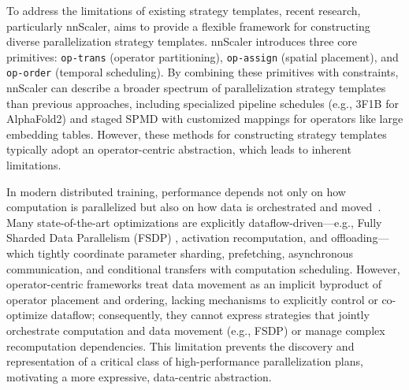 \documentclass[letterpaper,twocolumn,10pt]{article}
\begin{document}

To address the limitations of existing strategy templates, recent research, particularly nnScaler, aims to provide a flexible framework for constructing diverse parallelization strategy templates. nnScaler introduces three core primitives: \texttt{op-trans} (operator partitioning), \texttt{op-assign} (spatial placement), and \texttt{op-order} (temporal scheduling). By combining these primitives with constraints, nnScaler can describe a broader spectrum of parallelization strategy templates than previous approaches, including specialized pipeline schedules (e.g., 3F1B for AlphaFold2) and staged SPMD with customized mappings for operators like large embedding tables. However, these methods for constructing strategy templates typically adopt an operator-centric abstraction, which leads to inherent limitations.

In modern distributed training, performance depends not only on how computation is parallelized but also on how data is orchestrated and moved~\cite{huang2019yugong, qiu2025moirai}. Many state-of-the-art optimizations are explicitly dataflow-driven—e.g., Fully Sharded Data Parallelism (FSDP) \cite{rajbhandari2020zero}, activation recomputation, and offloading—which tightly coordinate parameter sharding, prefetching, asynchronous communication, and conditional transfers with computation scheduling. However, operator-centric frameworks \cite{lin2024nnscaler} treat data movement as an implicit byproduct of operator placement and ordering, lacking mechanisms to explicitly control or co-optimize dataflow; consequently, they cannot express strategies that jointly orchestrate computation and data movement (e.g., FSDP) or manage complex recomputation dependencies. This limitation prevents the discovery and representation of a critical class of high-performance parallelization plans, motivating a more expressive, data-centric abstraction.
\end{document}
